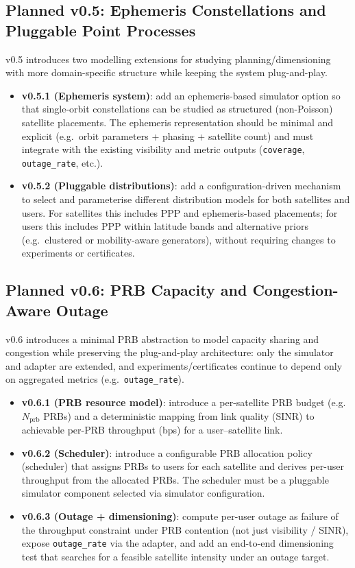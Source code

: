 \documentclass[11pt,a4paper]{article}
\begin{document}
\subsection{Planned v0.5: Ephemeris Constellations and Pluggable Point Processes}
v0.5 introduces two modelling extensions for studying planning/dimensioning with more domain-specific structure while
keeping the system plug-and-play.
\begin{itemize}
    \item \textbf{v0.5.1 (Ephemeris system)}: add an ephemeris-based simulator option so that single-orbit constellations
    can be studied as structured (non-Poisson) satellite placements. The ephemeris representation should be minimal and
    explicit (e.g.\ orbit parameters + phasing + satellite count) and must integrate with the existing visibility and
    metric outputs (\texttt{coverage}, \texttt{outage\_rate}, etc.).
    \item \textbf{v0.5.2 (Pluggable distributions)}: add a configuration-driven mechanism to select and parameterise
    different distribution models for both satellites and users. For satellites this includes PPP and ephemeris-based
    placements; for users this includes PPP within latitude bands and alternative priors (e.g.\ clustered or mobility-aware
    generators), without requiring changes to experiments or certificates.
\end{itemize}

\subsection{Planned v0.6: PRB Capacity and Congestion-Aware Outage}
v0.6 introduces a minimal PRB abstraction to model capacity sharing and congestion while preserving the
plug-and-play architecture: only the simulator and adapter are extended, and experiments/certificates continue
to depend only on aggregated metrics (e.g.\ \texttt{outage\_rate}).
\begin{itemize}
    \item \textbf{v0.6.1 (PRB resource model)}: introduce a per-satellite PRB budget (e.g.\ $N_{\mathrm{prb}}$ PRBs) and
    a deterministic mapping from link quality (SINR) to achievable per-PRB throughput (bps) for a user--satellite link.
    \item \textbf{v0.6.2 (Scheduler)}: introduce a configurable PRB allocation policy (scheduler) that assigns PRBs to users
    for each satellite and derives per-user throughput from the allocated PRBs. The scheduler must be a pluggable
    simulator component selected via simulator configuration.
    \item \textbf{v0.6.3 (Outage + dimensioning)}: compute per-user outage as failure of the throughput constraint under PRB
    contention (not just visibility / SINR), expose \texttt{outage\_rate} via the adapter, and add an end-to-end dimensioning
    test that searches for a feasible satellite intensity under an outage target.
\end{itemize}
\end{document}
